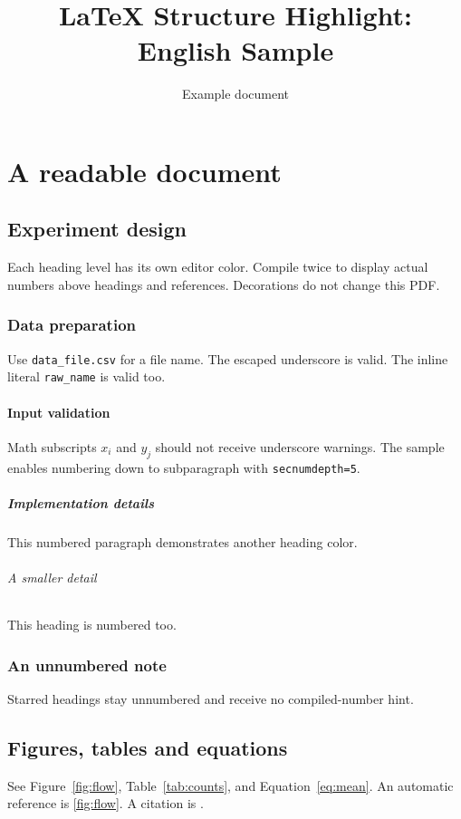 \documentclass[11pt]{report}
\title{LaTeX Structure Highlight: English Sample}
\author{Example document}
\date{}
\begin{document}
\maketitle
\tableofcontents
\chapter{A readable document}
\label{chap:overview}
\section{Experiment design}
\label{sec:design}
Each heading level has its own editor color. Compile twice to display actual
numbers above headings and references. Decorations do not change this PDF.

\subsection{Data preparation}
\label{sec:data}
Use \texttt{data\_file.csv} for a file name. The escaped underscore is valid.
The inline literal \verb|raw_name| is valid too.

\subsubsection{Input validation}
\label{sec:validation}
Math subscripts $x_i$ and \(y_j\) should not receive underscore warnings.
The sample enables numbering down to subparagraph with \texttt{secnumdepth=5}.

\paragraph{Implementation details}
\label{sec:implementation}
This numbered paragraph demonstrates another heading color.
\subparagraph{A smaller detail}
\label{sec:detail}
This heading is numbered too.
\subsection*{An unnumbered note}
Starred headings stay unnumbered and receive no compiled-number hint.

\section{Figures, tables and equations}
\label{sec:results}
See Figure~\ref{fig:flow}, Table~\ref{tab:counts}, and Equation~\eqref{eq:mean}.
An automatic reference is \autoref{fig:flow}. A citation is \cite{sample2026}.
\end{document}
